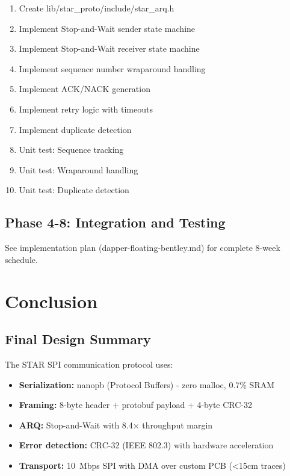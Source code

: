 \begin{enumerate}[label=\protect\checkbox]
    \item Create lib/star\_proto/include/star\_arq.h
    \item Implement Stop-and-Wait sender state machine
    \item Implement Stop-and-Wait receiver state machine
    \item Implement sequence number wraparound handling
    \item Implement ACK/NACK generation
    \item Implement retry logic with timeouts
    \item Implement duplicate detection
    \item Unit test: Sequence tracking
    \item Unit test: Wraparound handling
    \item Unit test: Duplicate detection
\end{enumerate}

\subsection{Phase 4-8: Integration and Testing}

See implementation plan (dapper-floating-bentley.md) for complete 8-week schedule.

\section{Conclusion}

\subsection{Final Design Summary}

The STAR SPI communication protocol uses:
\begin{itemize}
    \item \textbf{Serialization:} nanopb (Protocol Buffers) - zero malloc, 0.7\% SRAM
    \item \textbf{Framing:} 8-byte header + protobuf payload + 4-byte CRC-32
    \item \textbf{ARQ:} Stop-and-Wait with 8.4× throughput margin
    \item \textbf{Error detection:} CRC-32 (IEEE 802.3) with hardware acceleration
    \item \textbf{Transport:} 10~Mbps SPI with DMA over custom PCB (<15cm traces)
\end{itemize}

